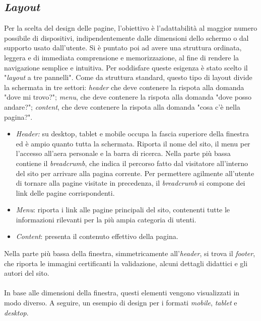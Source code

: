 \subsection{\textit{Layout}}
\label{progettazione-layout}
Per la scelta del design delle pagine, l'obiettivo è l'adattabilità al maggior numero possibile di dispositivi, indipendentemente dalle dimensioni dello schermo o dal supporto usato dall'utente. Si è puntato poi ad avere una struttura ordinata, leggera e di immediata comprensione e memorizzazione, al fine di rendere la navigazione semplice e intuitiva.
Per soddisfare queste esigenza è stato scelto il "\textit{layout} a tre pannelli". Come da struttura standard, questo tipo di layout divide la schermata in tre settori: \textit{header} che deve contenere la rispota alla domanda "dove mi trovo?"; \textit{menu}, che deve contenere la rispota alla domanda "dove posso andare?"; \textit{content}, che deve contenere la rispota alla domanda "cosa c'è nella pagina?".
\begin{itemize}
	\item \textit{Header:} su desktop, tablet e mobile occupa la fascia superiore della finestra ed è ampio quanto tutta la schermata. Riporta il nome del sito, il menu per l'accesso all'aera personale e la barra di ricerca. Nella parte più bassa contiene il \textit{breadcrumb}, che indica il percorso fatto dal visitatore all'interno del sito per arrivare alla pagina corrente. Per permettere agilmente all'utente di tornare alla pagine visitate in precedenza, il \textit{breadcrumb} si compone dei link delle pagine corrispondenti. 
	\item \textit{Menu}: riporta i link alle pagine principali del sito, contenenti tutte le informazioni rilevanti per la più ampia categoria di utenti.
	\item \textit{Content}: presenta il contenuto effettivo della pagina.
\end{itemize}
Nella parte più bassa della finestra, simmetricamente all'\textit{header}, si trova il \textit{footer}, che riporta le immagini certificanti la validazione, alcuni dettagli didattici e gli autori del sito. \\\\

In base alle dimensioni della finestra, questi elementi vengono visualizzati in modo diverso. A seguire, un esempio di design per i formati \textit{mobile}, \textit{tablet} e \textit{desktop}.

